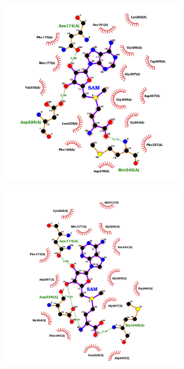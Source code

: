 \documentclass[12pt]{article}
\begin{document}
	\FloatBarrier
	\begin{figure}[h!]
		\centering
		\begin{subfigure}[h!]{0.35\textwidth}
			\hspace{2cm}
			\includegraphics[width=\textwidth]{../4/Dock/best.png}
			\caption{}
		\end{subfigure}
		\hfill
		\begin{subfigure}[h!]{0.35\textwidth}
			\hspace{-2cm}
			\includegraphics[width=\textwidth]{../4/Dock/best2.png}

\end{subfigure}
\end{figure}
\end{document}
